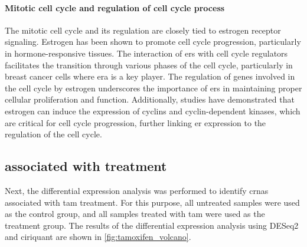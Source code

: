 \paragraph{Mitotic cell cycle and regulation of cell cycle process}
The mitotic cell cycle and its regulation are closely tied to estrogen receptor
signaling.
Estrogen has been shown to promote cell cycle progression, particularly in
hormone-responsive tissues.
The interaction of \glspl{er} with cell cycle regulators facilitates the
transition through various phases of the cell cycle, particularly in breast
cancer cells where \gls{era} is a key
player\supercite{drabovich_dynamics_2016}.
The regulation of genes involved in the cell cycle by estrogen underscores the
importance of \glspl{er} in maintaining proper cellular proliferation and
function\supercite{bjornstrom_mechanisms_2005}.
Additionally, studies have demonstrated that estrogen can induce the expression
of cyclins and cyclin-dependent kinases, which are critical for cell cycle
progression, further linking \gls{er} expression to the regulation of the cell
cycle\supercite{g_widespread_2009}.

\subsection{ associated with  treatment}

Next, the differential expression analysis was performed to identify
\glspl{crna} associated with \gls{tam} treatment.
For this purpose, all untreated samples were used as the control group, and all
samples treated with \gls{tam} were used as the treatment group.
The results of the differential expression analysis using DESeq2 and
\gls{ciriquant} are shown in \cref{fig:tamoxifen_volcano}.

